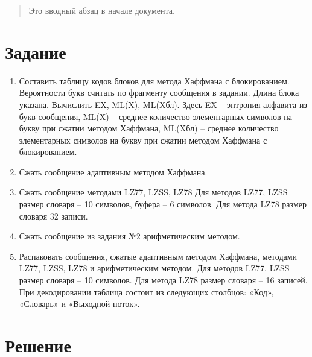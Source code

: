 \documentclass[a4paper, 12pt]{article}
\begin{document}
 
\tableofcontents

\pagebreak

\begin{abstract}
  Это вводный абзац в начале документа.
\end{abstract}
 
\section{Задание}
\begin{enumerate}
\item Составить таблицу кодов блоков для метода Хаффмана с блокированием. Вероятности букв считать по фрагменту сообщения в задании. Длина блока указана. Вычислить EX, ML(X), ML(Xбл). Здесь EX – энтропия алфавита из букв сообщения, ML(X) – среднее количество элементарных символов на букву при сжатии методом Хаффмана, ML(Xбл) – среднее количество элементарных символов на букву при сжатии методом Хаффмана с блокированием. 
\item Сжать сообщение адаптивным методом Хаффмана. 
\item Сжать сообщение методами LZ77, LZSS, LZ78  Для методов LZ77, LZSS размер словаря – 10 символов, буфера – 6 символов. Для метода LZ78 размер словаря 32 записи. 
\item Сжать сообщение из задания №2 арифметическим методом. 
\item Распаковать сообщения, сжатые адаптивным методом Хаффмана, методами LZ77, LZSS, LZ78 и арифметическим методом. Для методов LZ77, LZSS размер словаря – 10 символов. Для метода LZ78 размер словаря – 16 записей. При декодировании таблица состоит из следующих столбцов: «Код», «Словарь» и «Выходной поток».
\end{enumerate}
\pagebreak
\section{Решение}
\end{document}
